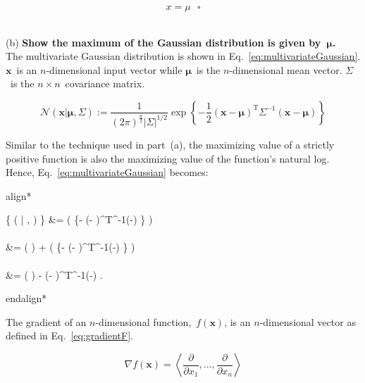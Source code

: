 \documentclass{report}
\newcommand{\hangindentdistance}{1cm}
\newenvironment{aligncustom}
{ \csname align*\endcsname %
    \centering
}
{
  \csname endalign*\endcsname
}
\newcommand{\subproblem}[2]{~\\ (#1) \hangindent=\hangindentdistance \hangafter=2 \tabto{\hangindentdistance} \textbf{#2}~\\}
\begin{document}
  \begin{equation}
    x = \mu ~~~\square
    \label{eq:univariateGaussianFinal}
  \end{equation}
  

  
  \subproblem{b}{Show the maximum of the Gaussian distribution is given by~$\bm{\mu}$.}
  
  The multivariate Gaussian distribution is shown in Eq.~\eqref{eq:multivariateGaussian}.  $\mathbf{x}$~is an $n$-dimensional input vector while $\bm{\mu}$~is the $n$-dimensional mean vector.  $\Sigma$~is the $n \times n$~covariance matrix.
    
  \begin{equation}
    \mathcal{N}(\mathbf{x} | \bm{\mu}, \Sigma) := \frac{1}{(2\pi)^{\frac{n}{2}} | \Sigma | ^ {1/2} } \exp\left\{-\frac{1}{2} \left(\mathbf{x}-\bm{\mu} \right)^{\textrm{T}}\Sigma^{-1}\left(\mathbf{x}-\bm{\mu}\right) \right\}
    \label{eq:multivariateGaussian}
  \end{equation}

  Similar to the technique used in part~(a), the maximizing value of a strictly positive function is also the maximizing value of the function's natural log.  Hence, Eq.~\eqref{eq:multivariateGaussian} becomes:
  
  \begin{aligncustom}
    \ln \left\{ ( | \bm{\mu}, \Sigma) \right\}  &= \ln \left(  \exp\left\{- \left(-\bm{\mu} \right)^{\textrm{T}}\Sigma^{-1}\left(-\bm{\mu}\right) \right\} \right) \\~\\
    &= \ln \left(  \right) + \ln \left( \exp\left\{- \left(-\bm{\mu} \right)^{\textrm{T}}\Sigma^{-1}\left(-\bm{\mu}\right) \right\} \right) \\~\\
    &= \ln \left(  \right) -  \left(-\bm{\mu} \right)^{\textrm{T}}\Sigma^{-1}\left(-\bm{\mu}\right)  \textrm{.}
  \end{aligncustom}

  The gradient of an $n$-dimensional function,~$f(\mathbf{x})$, is an $n$-dimensional vector as defined in Eq.~\eqref{eq:gradientF}.
  
  \begin{equation}
    \nabla f(\mathbf{x}) = \left\langle \frac{\partial}{\partial x_1}, ..., \frac{\partial}{\partial x_n} \right\rangle
    \label{eq:gradientF}
  \end{equation}
\end{document}
